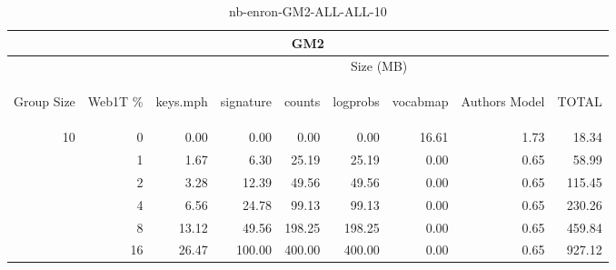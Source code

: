 \begin{center}
\begin{table}[htbp] 
 \begin{center}
\begin{tabular}{ | r | r | r | r | r | r | r | r | r |}
\hline
\multicolumn{9}{|c|}{GM2}\\
\hline
 & & \multicolumn{7}{|c|}{Size (MB)}\\ \cline{3-9}
\begin{sideways}Group Size\end{sideways} & \begin{sideways}Web1T \% \end{sideways} & \begin{sideways}keys.mph\end{sideways} & \begin{sideways}signature\end{sideways} & \begin{sideways}counts\end{sideways} & \begin{sideways}logprobs\end{sideways} & \begin{sideways}vocabmap\end{sideways} & \begin{sideways}Authors Model \end{sideways} & \begin{sideways}TOTAL\end{sideways}\\
\hline
\multirow{5}{*}{10}
 & 0 & 0.00 & 0.00 & 0.00 & 0.00 & 16.61 & 1.73 & 18.34\\ \cline{2-9}
 & 1 & 1.67 & 6.30 & 25.19 & 25.19 & 0.00 & 0.65 & 58.99\\ \cline{2-9}
 & 2 & 3.28 & 12.39 & 49.56 & 49.56 & 0.00 & 0.65 & 115.45\\ \cline{2-9}
 & 4 & 6.56 & 24.78 & 99.13 & 99.13 & 0.00 & 0.65 & 230.26\\ \cline{2-9}
 & 8 & 13.12 & 49.56 & 198.25 & 198.25 & 0.00 & 0.65 & 459.84\\ \cline{2-9}
 & 16 & 26.47 & 100.00 & 400.00 & 400.00 & 0.00 & 0.65 & 927.12\\ \cline{2-9}
\hline
\end{tabular}
\caption{nb-enron-GM2-ALL-ALL-10}
\label{table:nb-enron-GM2-ALL-ALL-10}
\end{center}
 \end{table}
\end{center}


